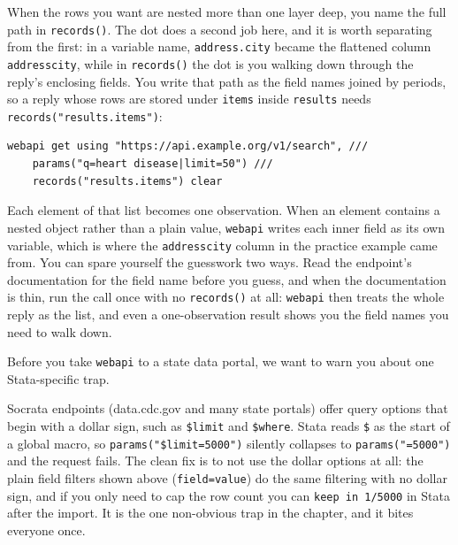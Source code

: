 \documentclass[
    a4paper,
    fontsize=10pt,
    twoside=true,
    numbers=noenddot,
]{kaobook}
\newenvironment{vizcallout}[1][Visualization to build]{%
    \begin{vizbox}[frametitle={#1}]%
}{%
    \end{vizbox}%
}
\begin{document}
When the rows you want are nested more than one layer deep, you name the full path in \texttt{records()}. The dot does a second job here, and it is worth separating from the first: in a variable name, \texttt{address.city} became the flattened column \texttt{addresscity}, while in \texttt{records()} the dot is you walking down through the reply's enclosing fields. You write that path as the field names joined by periods, so a reply whose rows are stored under \texttt{items} inside \texttt{results} needs \texttt{records("results.items")}:
\par
{\footnotesize
\begin{verbatim}
webapi get using "https://api.example.org/v1/search", ///
    params("q=heart disease|limit=50") ///
    records("results.items") clear
\end{verbatim}
}
Each element of that list becomes one observation. When an element contains a nested object rather than a plain value, \texttt{webapi} writes each inner field as its own variable, which is where the \texttt{addresscity} column in the practice example came from. You can spare yourself the guesswork two ways. Read the endpoint's documentation for the field name before you guess, and when the documentation is thin, run the call once with no \texttt{records()} at all: \texttt{webapi} then treats the whole reply as the list, and even a one-observation result shows you the field names you need to walk down.

Before you take \texttt{webapi} to a state data portal, we want to warn you about one Stata-specific trap.

\begin{vizcallout}[The one JSON trap in Stata: the \$ sign]
Socrata endpoints (data.cdc.gov and many state portals) offer query options that begin with a dollar sign, such as \texttt{\$limit} and \texttt{\$where}. Stata reads \texttt{\$} as the start of a global macro, so \texttt{params("\$limit=5000")} silently collapses to \texttt{params("=5000")} and the request fails. The clean fix is to not use the dollar options at all: the plain field filters shown above (\texttt{field=value}) do the same filtering with no dollar sign, and if you only need to cap the row count you can \texttt{keep in 1/5000} in Stata after the import. It is the one non-obvious trap in the chapter, and it bites everyone once.
\end{vizcallout}
\end{document}
